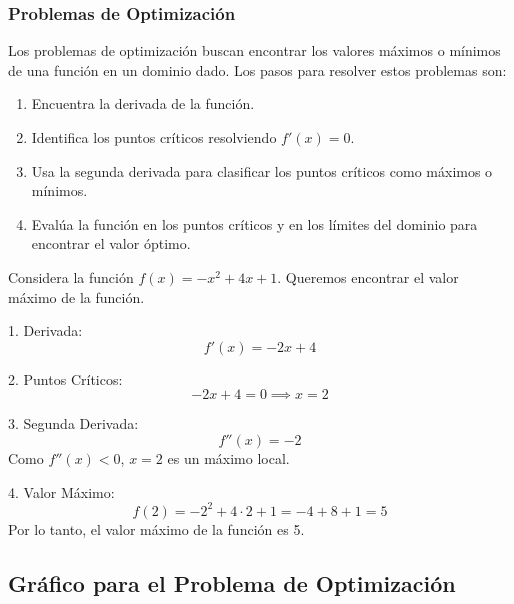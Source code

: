 \subsubsection{Problemas de Optimización}
Los problemas de optimización buscan encontrar los valores máximos o mínimos de una función en un dominio dado. Los pasos para resolver estos problemas son:

\begin{enumerate}
    \item Encuentra la derivada de la función.
    \item Identifica los puntos críticos resolviendo \( f'(x) = 0 \).
    \item Usa la segunda derivada para clasificar los puntos críticos como máximos o mínimos.
    \item Evalúa la función en los puntos críticos y en los límites del dominio para encontrar el valor óptimo.
\end{enumerate}

\begin{example}
    Considera la función \( f(x) = -x^2 + 4x + 1 \). Queremos encontrar el valor máximo de la función.

1. Derivada:
   \[
   f'(x) = -2x + 4
   \]

2. Puntos Críticos:
   \[
   -2x + 4 = 0 \implies x = 2
   \]

3. Segunda Derivada:
   \[
   f''(x) = -2
   \]
   Como \( f''(x) < 0 \), \( x = 2 \) es un máximo local.

4. Valor Máximo:
   \[
   f(2) = -2^2 + 4 \cdot 2 + 1 = -4 + 8 + 1 = 5
   \]
   Por lo tanto, el valor máximo de la función es 5.

   \subsection*{Gráfico para el Problema de Optimización}
   \begin{center}
   \end{center}
   
\end{example}
